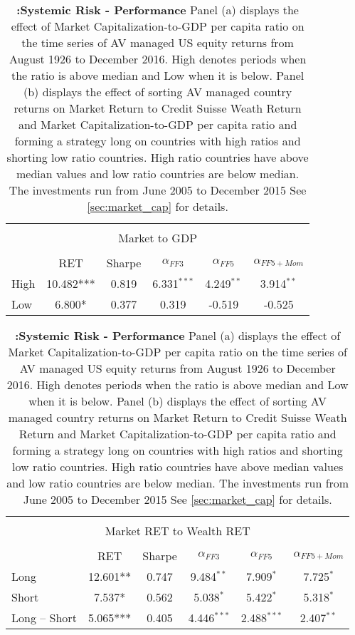 \begin{table}[!htbp]
	\centering \caption{\textbf{:Systemic Risk - Performance} \newline
		\footnotesize{Panel (a) displays the effect of  Market Capitalization-to-GDP per capita ratio on the time series of AV managed US equity returns from August 1926 to December 2016. High denotes periods when the ratio is above median and Low when it is below.
Panel (b) displays the effect of sorting AV managed country returns on Market Return to Credit Suisse Weath Return and Market Capitalization-to-GDP per capita ratio and forming a strategy long on countries with high ratios and shorting low ratio countries. High ratio countries have above median values and low ratio countries are below median. The investments run from June 2005 to December 2015 See \ref{sec:market_cap} for details.}}
	\label{tab:tab_sub_performance}
	\begin{adjustbox}{width=\textwidth,max height=.43\totalheight}
		\begin{tabular}{lccccc}
			\hline\\[-1.8ex]
			\multicolumn{6}{c}{Market to GDP}\\
			\hline\\[-1.8ex]
			& RET & Sharpe & $\alpha_{FF3}$ & $\alpha_{FF5}$ & $\alpha_{FF5+Mom}$ \\
			\cline{2-6}
High& 10.482*** &0.819 &6.331$^{***}$&  4.249$^{**}$ &  3.914$^{**}$\\
Low  & 6.800*& 0.377 & 0.319 & -0.519 & -0.525 \\
			\hline
		\end{tabular}
	\end{adjustbox}
	\begin{adjustbox}{width=\textwidth,max height=.43\totalheight}
	\begin{tabular}{lccccc}
		\hline\\[-1.8ex]
		\multicolumn{6}{c}{Market RET to Wealth RET}\\
		\hline\\[-1.8ex]
		& RET & Sharpe & $\alpha_{FF3}$ & $\alpha_{FF5}$ & $\alpha_{FF5+Mom}$ \\
		\cline{2-6}
		Long & 12.601** & 0.747 & 9.484$^{**}$ & 7.909$^{*}$ & 7.725$^{*}$ \\
		Short & 7.537* & 0.562 & 5.038$^{*}$ & 5.422$^{*}$ & 5.318$^{*}$ \\
		Long $–$ Short & 5.065*** & 0.405 & 4.446$^{***}$ & 2.488$^{***}$ & 2.407$^{**}$ \\

\end{tabular}
\end{adjustbox}
\end{table}
